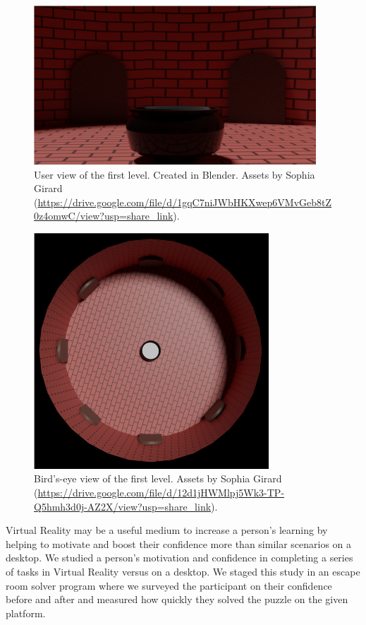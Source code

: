 \documentclass[manuscript,screen,review]{acmart}
\begin{document}
\begin{figure}[h]
  \centering
  \includegraphics[width=300pt]{UserView.png}
  \caption{User view of the first level. Created in Blender. Assets by Sophia Girard (\url{https://drive.google.com/file/d/1gqC7niJWbHKXwep6VMvGeb8tZ0z4omwC/view?usp=share_link}).}
\end{figure}

\begin{figure}[h]
  \centering
  \includegraphics[width=250pt]{OverheadView.png}
  \caption{Bird's-eye view of the first level. Assets by Sophia Girard
  (\url{https://drive.google.com/file/d/12d1jHWMlpj5Wk3-TP-Q5hmh3d0j-AZ2X/view?usp=share_link}).}
\end{figure}
\clearpage

Virtual Reality may be a useful medium to increase a person’s learning by helping to motivate and boost their confidence more than similar scenarios on a desktop. We studied a person’s motivation and confidence in completing a series of tasks in Virtual Reality versus on a desktop. We staged this study in an escape room solver program where we surveyed the participant on their confidence before and after and measured how quickly they solved the puzzle on the given platform.




\end{document}
